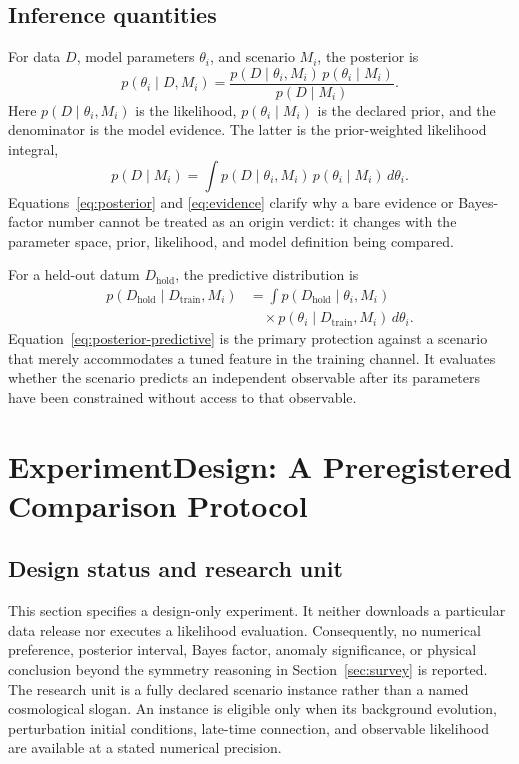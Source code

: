 \documentclass[10pt,conference]{IEEEtran}
\begin{document}
\subsection{Inference quantities}

For data $D$, model parameters $\theta_i$, and scenario $M_i$, the posterior is
\begin{equation}
p(\theta_i\mid D,M_i)=\frac{p(D\mid\theta_i,M_i)\,p(\theta_i\mid M_i)}{p(D\mid M_i)}.
\label{eq:posterior}
\end{equation}
Here $p(D\mid\theta_i,M_i)$ is the likelihood, $p(\theta_i\mid M_i)$ is the declared prior, and the denominator is the model evidence. The latter is the prior-weighted likelihood integral,
\begin{equation}
p(D\mid M_i)=\int p(D\mid\theta_i,M_i)\,p(\theta_i\mid M_i)\,d\theta_i.
\label{eq:evidence}
\end{equation}
Equations~\eqref{eq:posterior} and \eqref{eq:evidence} clarify why a bare evidence or Bayes-factor number cannot be treated as an origin verdict: it changes with the parameter space, prior, likelihood, and model definition being compared.

For a held-out datum $D_{\mathrm{hold}}$, the predictive distribution is
\begin{align}
p(D_{\mathrm{hold}}\mid D_{\mathrm{train}},M_i)
&=\int p(D_{\mathrm{hold}}\mid\theta_i,M_i) \nonumber\\
&\quad\times p(\theta_i\mid D_{\mathrm{train}},M_i)\,d\theta_i.
\label{eq:posterior-predictive}
\end{align}
Equation~\eqref{eq:posterior-predictive} is the primary protection against a scenario that merely accommodates a tuned feature in the training channel. It evaluates whether the scenario predicts an independent observable after its parameters have been constrained without access to that observable.

\section{ExperimentDesign: A Preregistered Comparison Protocol}
\label{sec:experiment-design}

\subsection{Design status and research unit}

This section specifies a design-only experiment. It neither downloads a particular data release nor executes a likelihood evaluation. Consequently, no numerical preference, posterior interval, Bayes factor, anomaly significance, or physical conclusion beyond the symmetry reasoning in Section~\ref{sec:survey} is reported. The research unit is a fully declared scenario instance rather than a named cosmological slogan. An instance is eligible only when its background evolution, perturbation initial conditions, late-time connection, and observable likelihood are available at a stated numerical precision.
\end{document}
